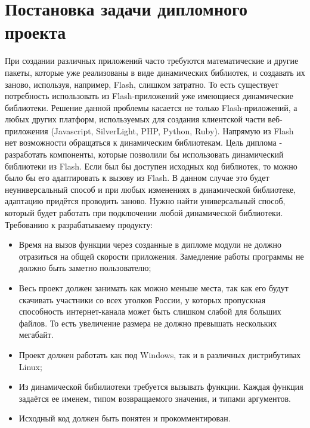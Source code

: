 \section{Постановка задачи дипломного проекта}
При создании различных приложений часто требуются математические и другие пакеты, которые уже реализованы в виде динамических библиотек, и создавать их заново, используя, например, Flash, слишком затратно. То есть существует потребность использовать из Flash-приложений уже имеющиеся динамические библиотеки. Решение данной проблемы касается не только Flash-приложений, а любых других платформ, используемых для создания клиентской части веб-приложения (Javascript, SilverLight, PHP, Python, Ruby).
Напрямую из Flash нет возможности обращаться к динамическим библиотекам. Цель диплома - разработать компоненты, которые позволили бы использовать динамический библиотеки из Flash.
Если был бы доступен исходных код библиотек, то можно было бы его адаптировать к вызову из Flash. В данном случае это будет неуниверсальный способ и при любых изменениях в динамической библиотеке, адаптацию придётся проводить заново. Нужно найти универсальный способ, который будет работать при подключении любой динамической библиотеки.
Требованию к разрабатываему продукту:
\begin{itemize}
  \item Время на вызов функции через созданные в дипломе модули не должно отразиться на общей скорости приложения. Замедление работы программы не должно быть заметно пользователю;
  \item Весь проект должен занимать как можно меньше места, так как его будут скачивать участники со всех уголков России, у которых пропускная способность интернет-канала может быть слишком слабой для больших файлов. То есть увеличение размера не должно превышать нескольких мегабайт.
  \item Проект должен работать как под Windows, так и в различных дистрибутивах Linux;
  \item Из динамической бибилиотеки требуется вызывать функции. Каждая функция задаётся ее именем, типом возвращаемого значения, и типами аргументов.
  \item Исходный код должен быть понятен и прокомментирован.
\end{itemize}